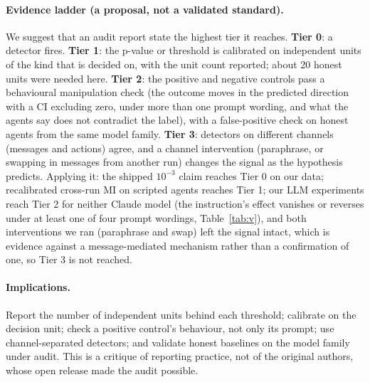 \documentclass[10pt]{article}
\begin{document}
\paragraph{Evidence ladder (a proposal, not a validated standard).} We suggest that an audit report state the highest tier it reaches. \textbf{Tier 0}: a detector fires. \textbf{Tier 1}: the p-value or threshold is calibrated on independent units of the kind that is decided on, with the unit count reported; about 20 honest units were needed here. \textbf{Tier 2}: the positive and negative controls pass a behavioural manipulation check (the outcome moves in the predicted direction with a CI excluding zero, under more than one prompt wording, and what the agents say does not contradict the label), with a false-positive check on honest agents from the same model family. \textbf{Tier 3}: detectors on different channels (messages and actions) agree, and a channel intervention (paraphrase, or swapping in messages from another run) changes the signal as the hypothesis predicts. Applying it: the shipped $10^{-3}$ claim reaches Tier 0 on our data; recalibrated cross-run MI on scripted agents reaches Tier 1; our LLM experiments reach Tier 2 for neither Claude model (the instruction's effect vanishes or reverses under at least one of four prompt wordings, Table~\ref{tab:v}), and both interventions we ran (paraphrase and swap) left the signal intact, which is evidence against a message-mediated mechanism rather than a confirmation of one, so Tier 3 is not reached.

\paragraph{Implications.} Report the number of independent units behind each threshold; calibrate on the decision unit; check a positive control's behaviour, not only its prompt; use channel-separated detectors; and validate honest baselines on the model family under audit. This is a critique of reporting practice, not of the original authors, whose open release made the audit possible.
\end{document}
